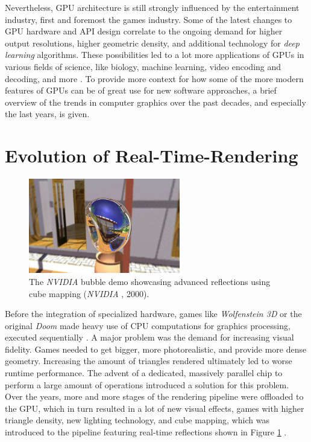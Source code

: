 \noindent
Nevertheless, \ac{GPU} architecture is still strongly influenced by the entertainment 
industry, first and foremost the games industry. Some of the latest changes to \ac{GPU} 
hardware and \ac{API} design correlate to the ongoing demand for higher output resolutions, 
higher geometric density, and additional technology for \emph{deep learning} algorithms. 
These possibilities led to a lot more applications of \ac{GPU}s in various fields of science, 
like biology, machine learning, video encoding and decoding, and more \cite{Battaglia2024}.
To provide more context for how some of the more modern features of \ac{GPU}s can be of great 
use for new software approaches, a brief overview of the trends in computer graphics over 
the past decades, and especially the last years, is given.


\section{Evolution of Real-Time-Rendering} \label{sec-evolution-of-real-time-rendering}

\begin{figure}[h]
    \centering
    \includegraphics[width=250px]{images/graphics/bubble-reflection-effects-demo.jpg}
    \caption{The \emph{NVIDIA} bubble demo showcasing advanced reflections using cube mapping (\emph{NVIDIA} \cite{NVIDIABubble}, 2000).}
    \label{fig:bubble-reflection-demo}
\end{figure}

\noindent
Before the integration of specialized hardware, games like \emph{Wolfenstein 3D} or the 
original \emph{Doom} made heavy use of \ac{CPU} computations for graphics processing, 
executed sequentially \cite{NVIDIA1999}. A major problem was the demand for increasing 
visual fidelity. Games needed to get bigger, more photorealistic, and provide more dense 
geometry. Increasing the amount of triangles rendered ultimately led to worse runtime 
performance. The advent of a dedicated, massively parallel chip to perform a large amount of 
operations introduced a solution for this problem. Over the years, more and more stages of the 
rendering pipeline were offloaded to the \ac{GPU}, which in turn resulted in a lot of new visual 
effects, games with higher triangle density, new lighting technology, and cube mapping, which 
was introduced to the pipeline featuring real-time reflections shown in  Figure 
\ref{fig:bubble-reflection-demo} \cite{Battaglia2024}.


